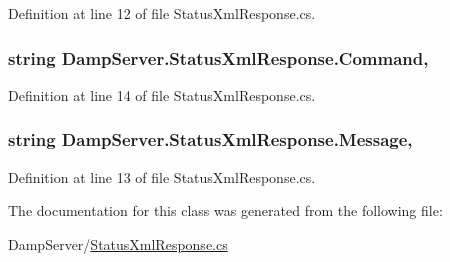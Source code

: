 Definition at line 12 of file Status\-Xml\-Response.\-cs.

\hypertarget{class_damp_server_1_1_status_xml_response_af550507a0d63fe5f9ec4e7f11f3e5141}{
\subsubsection[{Command}]{\setlength{\rightskip}{0pt plus 5cm}string Damp\-Server.\-Status\-Xml\-Response.\-Command\hspace{0.3cm}{\ttfamily [get]}, {\ttfamily [set]}}}\label{class_damp_server_1_1_status_xml_response_af550507a0d63fe5f9ec4e7f11f3e5141}


Definition at line 14 of file Status\-Xml\-Response.\-cs.

\hypertarget{class_damp_server_1_1_status_xml_response_a1b9e014c3a793fadac149bf22ed53362}{
\subsubsection[{Message}]{\setlength{\rightskip}{0pt plus 5cm}string Damp\-Server.\-Status\-Xml\-Response.\-Message\hspace{0.3cm}{\ttfamily [get]}, {\ttfamily [set]}}}\label{class_damp_server_1_1_status_xml_response_a1b9e014c3a793fadac149bf22ed53362}


Definition at line 13 of file Status\-Xml\-Response.\-cs.



The documentation for this class was generated from the following file\-:\begin{DoxyCompactItemize}
\item 
Damp\-Server/\hyperlink{_status_xml_response_8cs}{Status\-Xml\-Response.\-cs}\end{DoxyCompactItemize}
